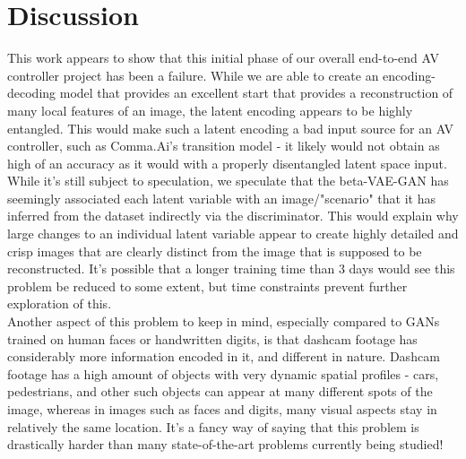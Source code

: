 \documentclass{article}
\begin{document}
\section{Discussion}
This work appears to show that this initial phase of our overall end-to-end AV controller project has been a failure. While we are able to create an encoding-decoding model that provides an excellent start that provides a reconstruction of many local features of an image, the latent encoding appears to be highly entangled. This would make such a latent encoding a bad input source for an AV controller, such as Comma.Ai's transition model - it likely would not obtain as high of an accuracy as it would with a properly disentangled latent space input. While it's still subject to speculation, we speculate that the beta-VAE-GAN has seemingly associated each latent variable with an image/"scenario" that it has inferred from the dataset indirectly via the discriminator. This would explain why large changes to an individual latent variable appear to create highly detailed and crisp images that are clearly distinct from the image that is supposed to be reconstructed. It's possible that a longer training time than 3 days would see this problem be reduced to some extent, but time constraints prevent further exploration of this. \\ 
Another aspect of this problem to keep in mind, especially compared to GANs trained on human faces or handwritten digits, is that dashcam footage has considerably more information encoded in it, and different in nature. Dashcam footage has a high amount of objects with very dynamic spatial profiles - cars, pedestrians, and other such objects can appear at many different spots of the image, whereas in images such as faces and digits, many visual aspects stay in relatively the same location. It's a fancy way of saying that this problem is drastically harder than many state-of-the-art problems currently being studied!
\end{document}
